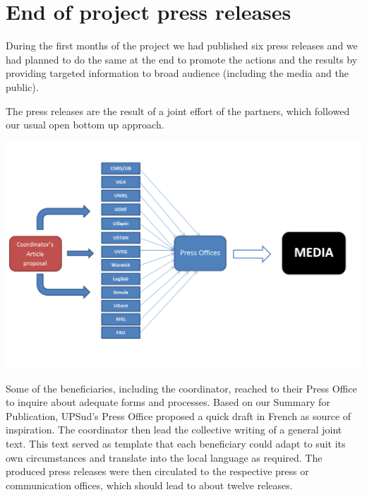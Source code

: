 \documentclass{deliverablereport}
\author{Izabela Faguet, Viviane Pons, Nicolas M. Thiéry}
\begin{document}
\maketitle
\githubissuedescription


\section{End of project press releases}

During the first months of the project we had published six press
releases and we had planned to do the same at the end to promote the
actions and the results by providing targeted information to broad
audience (including the media and the public).


The press releases are the result of a joint effort of the partners,
which followed our usual open bottom up approach.

\includegraphics[width=\textwidth]{PressReleasesProcess.png}

Some of the beneficiaries, including the coordinator, reached to their
Press Office to inquire about adequate forms and processes. Based on
our Summary for Publication, UPSud's Press Office proposed a quick
draft in French as source of inspiration. The coordinator then lead
the collective writing of a general joint text. This text served as
template that each beneficiary could adapt to suit its own
circumstances and translate into the local language as required. The
produced press releases were then circulated to the respective press
or communication offices, which should lead to about twelve releases.
\end{document}
